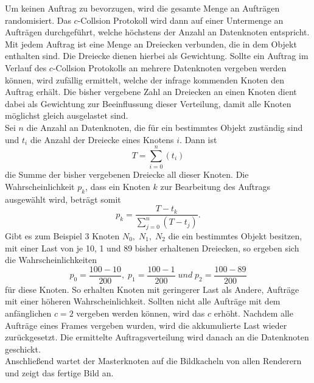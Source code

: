 Um keinen Auftrag zu bevorzugen, wird die gesamte Menge an Aufträgen randomisiert. Das $c$-Collsion Protokoll wird dann auf einer Untermenge an Aufträgen durchgeführt, welche höchstens der Anzahl an Datenknoten entspricht. Mit jedem Auftrag ist eine Menge an Dreiecken verbunden, die in dem Objekt enthalten sind. Die Dreiecke dienen hierbei als Gewichtung. Sollte ein Auftrag im Verlauf des $c$-Collsion Protokolls an mehrere Datenknoten vergeben werden können, wird zufällig ermittelt, welche der infrage kommenden Knoten den Auftrag erhält. Die bisher vergebene Zahl an Dreiecken an einen Knoten dient dabei als Gewichtung zur Beeinflussung dieser Verteilung, damit alle Knoten möglichst gleich ausgelastet sind.\\
Sei $n$ die Anzahl an Datenknoten, die für ein bestimmtes Objekt zuständig sind und $t_i$ die Anzahl der Dreiecke eines Knotens $i$. Dann ist
\[T=\sum_{i=0}^{n} \left(t_i\right)\]
die Summe der bisher vergebenen Dreiecke all dieser Knoten. Die Wahrscheinlichkeit $p_k$, dass ein Knoten $k$ zur Bearbeitung des Auftrags ausgewählt wird, beträgt somit 
  \[p_k=\frac{T-t_k}{\sum_{j=0}^{n} \left(T-t_j\right)}.\]
Gibt es zum Beispiel 3 Knoten $N_0,\; N_1,\; N_2$ die ein bestimmtes Objekt besitzen, mit einer Last von je 10, 1 und 89 bisher erhaltenen Dreiecken, so ergeben sich die Wahrscheinlichkeiten
\[p_0=\frac{100-10}{200}, \;p_1=\frac{100-1}{200}\; und \;p_2=\frac{100-89}{200}\]
für diese Knoten. So erhalten Knoten mit geringerer Last als Andere, Aufträge mit einer höheren Wahrscheinlichkeit. Sollten nicht alle Aufträge mit dem anfänglichen $c=2$ vergeben werden können, wird das $c$ erhöht. Nachdem alle Aufträge eines Frames vergeben wurden, wird die akkumulierte Last wieder zurückgesetzt. Die ermittelte Auftragsverteilung wird danach an die Datenknoten geschickt.\\
Anschließend wartet der Masterknoten auf die Bildkacheln von allen Renderern und zeigt das fertige Bild an.

